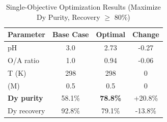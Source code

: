\begin{table}[htbp]
\centering
\caption{Single-Objective Optimization Results (Maximize Dy Purity, Recovery $\geq$ 80\%)}
\label{tab:optimization}
\begin{tabular}{lccc}
\toprule
Parameter & Base Case & Optimal & Change \\
\midrule
pH & 3.0 & 2.73 & -0.27 \\
O/A ratio & 1.0 & 0.94 & -0.06 \\
T (K) & 298 & 298 & 0 \\
[D2EHPA] (M) & 0.5 & 0.5 & 0 \\
\textbf{Dy purity} & 58.1\% & \textbf{78.8\%} & +20.8\% \\
Dy recovery & 92.8\% & 79.1\% & -13.8\% \\
\bottomrule
\end{tabular}
\end{table}